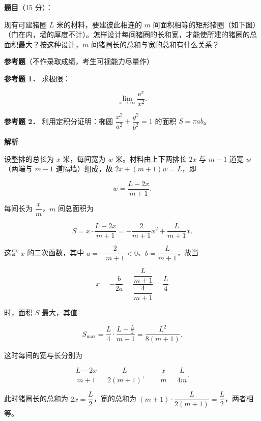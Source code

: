 \begin{answer}

\textbf{题目}（15 分）：

现有可建猪圈 $L$ 米的材料，要建彼此相连的 $m$ 间面积相等的矩形猪圈（如下图）（门在内，墙的厚度不计）。怎样设计每间猪圈的长和宽，才能使所建的猪圈的总面积最大？按这种设计，$m$ 间猪圈长的总和与宽的总和有什么关系？
\nopagebreak[4]
\begin{center}\end{center}
\nopagebreak[4]
\begin{gktip}
\textbf{参考题}（不作录取成绩，考生可视能力尽量作）
\end{gktip}

\textbf{参考题 1．} 求极限：

\nopagebreak[4]
\[
\lim_{x\to\infty}\frac{\mathrm e^x}{x^2}.
\]

\textbf{参考题 2．} 利用定积分证明：椭圆 $\dfrac{x^2}{a^2}+\dfrac{y^2}{b^2}=1$ 的面积 $S=\pi ab$。

\textbf{解析}
\nopagebreak[4]
\begin{center}\end{center}
\nopagebreak[4]
设整排的总长为 $x$ 米，每间宽为 $w$ 米。材料由上下两排长 $2x$ 与 $m+1$ 道宽 $w$（两端与 $m-1$ 道隔墙）组成，故 $2x+(m+1)w=L$，即

\nopagebreak[4]
\[
w=\frac{L-2x}{m+1}.
\]

每间长为 $\dfrac{x}{m}$，$m$ 间总面积为

\nopagebreak[4]
\[
S=x\cdot\frac{L-2x}{m+1}
=-\frac{2}{m+1}x^2+\frac{L}{m+1}x.
\]

这是 $x$ 的二次函数，其中 $a=-\dfrac{2}{m+1}<0$、$b=\dfrac{L}{m+1}$，故当

\nopagebreak[4]
\[
x=-\frac{b}{2a}=\frac{\dfrac{L}{m+1}}{\dfrac{4}{m+1}}=\frac{L}{4}
\]

时，面积 $S$ 最大，其值

\nopagebreak[4]
\[
S_{\max}=\frac{L}{4}\cdot\frac{L-\frac{L}{2}}{m+1}
=\frac{L^2}{8(m+1)}.
\]

这时每间的宽与长分别为

\nopagebreak[4]
\[
\frac{L-2x}{m+1}=\frac{L}{2(m+1)},
\qquad
\frac{x}{m}=\frac{L}{4m}.
\]

此时猪圈长的总和为 $2x=\dfrac{L}{2}$，宽的总和为 $(m+1)\cdot\dfrac{L}{2(m+1)}=\dfrac{L}{2}$，两者相等。


\end{answer}
